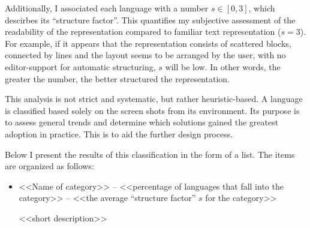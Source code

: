 Additionally, I associated each language with a number $s \in [0, 3]$, which
descirbes its ``structure factor''. This quantifies my subjective assessment of the readability of the representation compared to familiar text representation ($s = 3$). For example, if it appears that the representation consists of scattered blocks, connected by lines and the layout seems to be arranged by the user, with no editor-support for automatic structuring, $s$ will be low. In other words, the greater the number, the better structured the representation.

This analysis is not strict and systematic, but rather heuristic-based. A language is classified based solely on the screen shots from its environment. Its purpose is to assess general trends and determine which solutions gained the greatest adoption in practice. This is to aid the further design process. 

Below I present the results of this classification in the form of a list. The items are organized as follows:

\begin{itemize}
    \item <<Name of category>> -- <<percentage of languages that fall into the
category>> -- <<the average ``structure factor'' $s$ for the category>>

    <<short description>>
\end{itemize}

